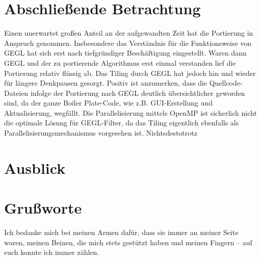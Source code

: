 \documentclass[10pt,a4paper]{article}
\begin{document}
\section{Abschließende Betrachtung}
Einen unerwartet großen Anteil an der aufgewandten Zeit hat die Portierung in Anspruch genommen. Insbesondere das Verständnis für die Funktionsweise von GEGL hat sich erst nach tiefgründiger Beschäftigung eingestellt. Waren dann GEGL und der zu portierende Algorithmus erst einmal verstanden lief die Portierung relativ flüssig ab. Das Tiling durch GEGL hat jedoch hin und wieder für längere Denkpausen gesorgt.
Positiv ist anzumerken, dass die Quellcode-Dateien infolge der Portierung nach GEGL deutlich übersichtlicher geworden sind, da der ganze Boiler Plate-Code, wie z.B. GUI-Erstellung und Aktualisierung, wegfällt.
Die Parallelisierung mittels OpenMP ist sicherlich nicht die optimale Lösung für GEGL-Filter, da das Tiling eigentlich ebenfalls als Parallelisierungsmechanismus vorgesehen ist. Nichtsdestotrotz 

\section{Ausblick}
\section{Grußworte}
Ich bedanke mich bei meinen Armen dafür, dass sie immer an meiner Seite waren, meinen Beinen, die mich stets gestützt haben und meinen Fingern -- auf euch konnte ich immer zählen.
%
\end{document}
